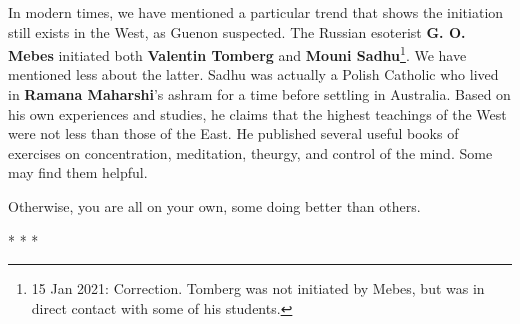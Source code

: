 In modern times, we have mentioned a particular trend that shows the initiation still exists in the West, as Guenon suspected. The Russian esoterist \textbf{G. O. Mebes} initiated both \textbf{Valentin Tomberg} and \textbf{Mouni Sadhu}\footnote{15 Jan 2021: Correction. Tomberg was not initiated by Mebes, but was in direct contact with some of his students.}. We have mentioned less about the latter. Sadhu was actually a Polish Catholic who lived in \textbf{Ramana Maharshi}'s ashram for a time before settling in Australia. Based on his own experiences and studies, he claims that the highest teachings of the West were not less than those of the East. He published several useful books of exercises on concentration, meditation, theurgy, and control of the mind. Some may find them helpful.

Otherwise, you are all on your own, some doing better than others.


\begin{center}* * *\end{center}

